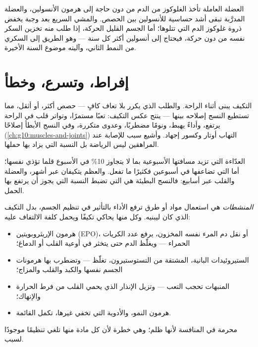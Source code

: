 \begin{example}\label{ex:g10:sport-and-health:sugar}
العضلة العاملة تأخذ الغلوكوز من الدم من دون حاجة إلى هرمون الأنسولين،
والعضلة المدرَّبة تبقى أشد حساسية للأنسولين بين الحصص. والمشي السريع
بعد وجبة يخفض ذروة غلوكوز الدم التي تتلوها؛ أما الجسم القليل الحركة،
إذا طلب منه تخزين السكر نفسه من دون حركة، فيحتاج إلى أنسولين أكثر كل
سنة --- وهو الطريق إلى السكري من النمط الثاني، وآليته موضوع السنة
الأخيرة.
\end{example}

\section{إفراط، وتسرع، وخطأ}

\begin{proposition}\label{prop:g10:sport-and-health:overtraining}
التكيف يبنى أثناء الراحة. والطلب الذي يكرر بلا تعاف كافٍ --- حصص أكثر،
أو أثقل، مما تستطيع النسج إصلاحه بينها --- ينتج عكس التكيف: تعبًا
مستمرًا، وتواتر قلب في الراحة يرتفع، وأداءً يهبط، ونومًا مضطربًا،
وعدوى متكررة، وفي النسج الأبطأ إصلاحًا
(\cref{ch:g10:muscles-and-joints}) التهاب أوتار وكسور إجهاد. وأشيع
سبب للإصابة عند المراهقين ليس الرياضة بل النسبة التي يزاد بها حملها.
\end{proposition}
\admitted

\begin{example}\label{ex:g10:sport-and-health:tenpercent}
العدّاءة التي تزيد مسافتها الأسبوعية بما لا يتجاوز 10\% في الأسبوع
قلما تؤذي نفسها؛ أما التي تضاعفها في أسبوعين فكثيرًا ما تفعل. والعظم
 يتكيفان عبر أشهر، والعضلة والقلب عبر أسابيع: فالنسج البطيئة هي
التي تضبط النسبة التي يجوز أن يرتفع بها الحمل.
\end{example}

\begin{proposition}[المنشطات]\label{prop:g10:sport-and-health:doping}
\emph{المنشطات} هي استعمال مواد أو طرق ترفع الأداء
بالتأثير في تنظيم الجسم، بدل التكيف الذي كان  ليبنيه. وكل منها
يحاكي تكيفًا ويحمل كلفة الالتفاف عليه:
\begin{itemize}
  \item هرمون الإريثروبويتين (EPO)، أو نقل دم المرء نفسه المخزون،
        يرفع عدد الكريات الحمراء --- ويغلّظ الدم حتى يتخثر في أوعية
        القلب أو الدماغ؛
  \item الستيروئيدات البانية، المشتقة من التستوستيرون، تغلّظ  --- وتضطرب بها هرمونات الجسم نفسها والكبد والقلب
        والمزاج؛
  \item المنبهات تحجب التعب --- وتزيل الإنذار الذي يحمي القلب من فرط
        الحرارة والإنهاك؛
  \item هرمون النمو، والأدوية التي تخفي غيرها، تكمل القائمة.
\end{itemize}
 محرمة في المنافسة لأنها ظلم؛ وهي خطرة لأن كل مادة منها تلغي
تنظيمًا موجودًا لسبب.
\end{proposition}
\admitted

